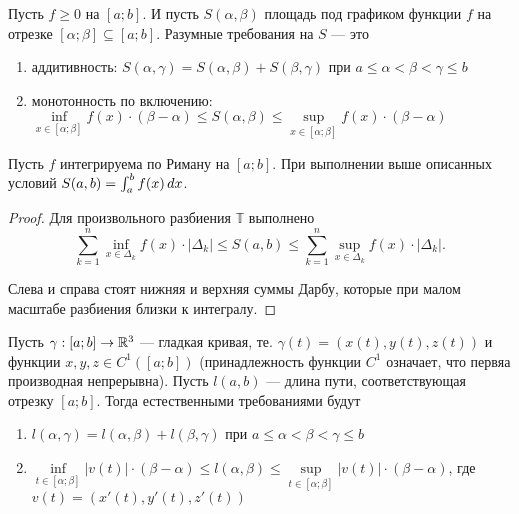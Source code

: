 \documentclass[a4paper]{article}
\theoremstyle{named}
\newcommand{\T}{\mathbb{T}}
\renewcommand{\int}{\intop}
\begin{document}
    	Пусть $f \geq 0$ на $[a; b]$. И пусть $S(\alpha, \beta)$ площадь под графиком функции $f$ на отрезке $[\alpha; \beta] \subseteq [a; b]$. Разумные требования на $S$ --- это

    	\begin{enumerate}
    	\item 
    		аддитивность: $S(\alpha, \gamma) = S(\alpha, \beta) + S(\beta, \gamma)$ при $a \leq \alpha < \beta < \gamma \leq b$

    	\item
    		монотонность по включению: $\inf\limits_{x \in [\alpha; \beta]} f(x) \cdot (\beta - \alpha) \leq S(\alpha, \beta) \leq \sup\limits_{x \in [\alpha; \beta]} f(x) \cdot (\beta - \alpha)$ 
    	\end{enumerate}

    	\begin{proposal*}
    		Пусть $f$ интегрируема по Риману на $[a; b]$. При выполнении выше описанных условий $S(a, b) = \int_a^b f(x) \dd x$.
    	\end{proposal*}

    	\begin{proof}
    		Для произвольного разбиения $\T$ выполнено
    		\begin{equation*}
    			\sum_{k = 1}^n \inf\limits_{x \in \Delta_k} f(x) \cdot |\Delta_k| \leq S(a, b) \leq \sum_{k = 1}^n \sup_{x \in \Delta_k} f(x) \cdot |\Delta_k|.
    		\end{equation*}

    		Слева и справа стоят нижняя и верхняя суммы Дарбу, которые при малом масштабе разбиения близки к интегралу.
    	\end{proof}

    	Пусть $\gamma: [a; b] \to \mathbb{R}^3$ --- гладкая кривая, те. $\gamma(t) = (x(t), y(t), z(t))$ и функции $x, y, z \in C^1([a; b])$ (принадлежность функции $C^1$ означает, что первяа производная непрерывна). Пусть $l(a, b)$ --- длина пути, соответствующая отрезку $[a; b]$. Тогда естественными требованиями будут

    	\begin{enumerate}
    	\item
    		$l(\alpha, \gamma) = l(\alpha, \beta) + l(\beta, \gamma)$ при $a \leq \alpha < \beta < \gamma \leq b$

    	\item
    		$\inf\limits_{t \in [\alpha; \beta]} |v(t)| \cdot (\beta - \alpha) \leq l(\alpha, \beta) \leq \sup\limits_{t \in [\alpha; \beta]} |v(t)| \cdot (\beta - \alpha)$, где $v(t) =  (x'(t), y'(t), z'(t))$
    	\end{enumerate}
\end{document}

